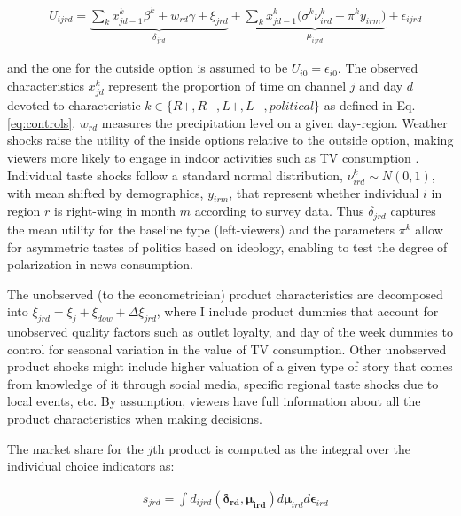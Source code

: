 \documentclass[12pt]{article}
\begin{document}
	
	\begin{equation}\label{eq:utility}
		\begin{aligned}
			& U_{ijrd}= \underbrace{\sum_k x_{jd-1}^k\beta^k+w_{rd}   \gamma  +  \xi_{jrd}}_{\delta_{jrd}}  + \underbrace{  \sum_k x_{jd-1}^k \Big( \sigma^k \nu_{ird}^k  + \pi^ky_{irm} \Big)}_{\mu_{ijrd}}+\epsilon_{ijrd} 
		\end{aligned}
	\end{equation} 
	
	and the one for the outside option is assumed to be $U_{i0}=\epsilon_{i0}$. The observed characteristics $ x_{jd}^k $ represent the  proportion of time on channel $ j $ and day $ d$ devoted to characteristic $ k \in \{R+,R-,L+,L-,political\}$ as defined in Eq. \eqref{eq:controls}. $w_{rd}$ measures the precipitation level on a given day-region. Weather shocks raise the utility of the inside options  relative to the outside option, making viewers more likely to engage in indoor activities such as TV consumption \citep{wilbur}. Individual taste shocks follow a standard normal distribution, $ \nu_{ird}^k \sim N(0,1)$, with mean shifted by  demographics, $ y_{irm} $, that represent whether individual $i$ in region $r$ is right-wing in month $m$ according to survey data.	Thus $\delta_{jrd}$ captures the mean utility for the baseline type (left-viewers) and the parameters $\pi^k$ allow for asymmetric tastes of politics based on ideology, enabling to test the degree of polarization in news consumption. 

The unobserved (to the econometrician) product characteristics are decomposed into $\xi_{jrd}= \xi_j + \xi_{dow} + \Delta \xi_{jrd}$, where I include product dummies that account for unobserved quality factors such as outlet loyalty, and day of the week dummies to control for  seasonal variation in the value of TV consumption. Other unobserved product shocks might include higher valuation of a given type of story that comes from knowledge of it through social media, specific regional taste shocks due to local events, etc. By assumption, viewers have full information about all the product characteristics when making decisions. %


The market share for the $j$th product is computed as the integral over the individual choice indicators as: 
	
	
	\begin{equation}\label{eq:shares}
	\begin{aligned}
		& s_{jrd} = \int d_{ijrd}(\bm{\delta_{rd}},\bm{\mu_{ird}})d\bm{\mu}_{ird}d\bm{\epsilon}_{ird}
	\end{aligned} 
\end{equation} 
	
\end{document}

